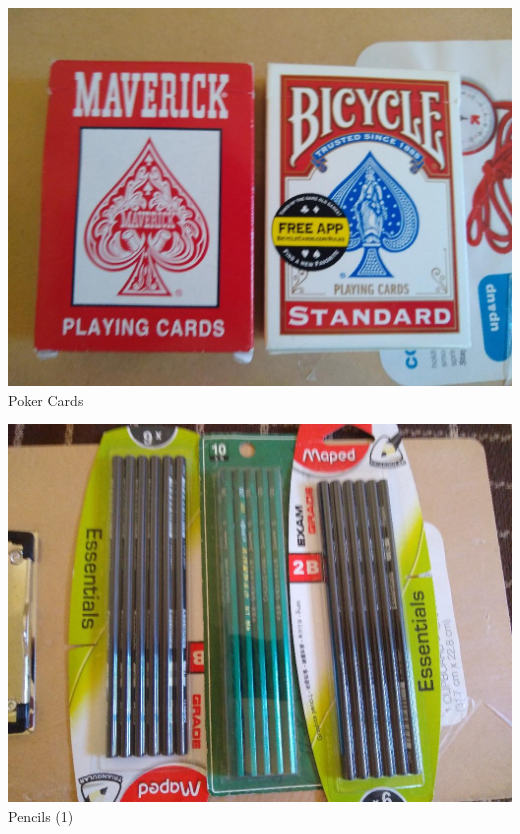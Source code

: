 \documentclass[t]{beamer}
\newcommand{\htarget}[2]{\hypertarget{#1}{#2}}
\begin{document}
\begin{frame}\htarget{poker}{} \begin{center}
\includegraphics[height=0.8\textheight]{poker_card_mini.jpg} \\
Poker Cards
\end{center} \end{frame}
\begin{frame}\htarget{pencil1}{} \begin{center}
\includegraphics[height=0.8\textheight]{pencil_pack_mini.jpg} \\
Pencils (1)
\end{center} \end{frame}
\end{document}
